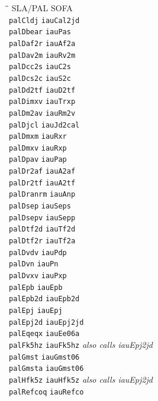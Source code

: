 \documentclass[twoside,11pt]{article}
\renewcommand{\_}{\texttt{\symbol{95}}}
\begin{document}
\begin{tabbing}
\hspace*{2cm}\=\hspace*{3cm}\= \kill
SLA/PAL \>  SOFA \\
\texttt{palCldj} \> \texttt{iauCal2jd} \\
\texttt{palDbear} \> \texttt{iauPas} \\
\texttt{palDaf2r} \> \texttt{iauAf2a} \\
\texttt{palDav2m} \>  \texttt{iauRv2m} \\
\texttt{palDcc2s} \>  \texttt{iauC2s} \\
\texttt{palDcs2c} \> \texttt{iauS2c} \\
\texttt{palDd2tf} \> \texttt{iauD2tf}\\
\texttt{palDimxv} \> \texttt{iauTrxp}\\
\texttt{palDm2av} \> \texttt{iauRm2v}\\
\texttt{palDjcl} \> \texttt{iauJd2cal}\\
\texttt{palDmxm} \> \texttt{iauRxr}\\
\texttt{palDmxv} \> \texttt{iauRxp}\\
\texttt{palDpav} \> \texttt{iauPap}\\
\texttt{palDr2af} \> \texttt{iauA2af}\\
\texttt{palDr2tf} \> \texttt{iauA2tf}\\
\texttt{palDranrm} \> \texttt{iauAnp}\\
\texttt{palDsep} \> \texttt{iauSeps}\\
\texttt{palDsepv} \> \texttt{iauSepp}\\
\texttt{palDtf2d} \> \texttt{iauTf2d}\\
\texttt{palDtf2r} \> \texttt{iauTf2a}\\
\texttt{palDvdv} \> \texttt{iauPdp}\\
\texttt{palDvn} \> \texttt{iauPn}\\
\texttt{palDvxv} \> \texttt{iauPxp}\\
\texttt{palEpb} \> \texttt{iauEpb}\\
\texttt{palEpb2d} \> \texttt{iauEpb2d}\\
\texttt{palEpj} \> \texttt{iauEpj}\\
\texttt{palEpj2d} \> \texttt{iauEpj2jd}\\
\texttt{palEqeqx} \> \texttt{iauEe06a}\\
\texttt{palFk5hz} \> \texttt{iauFk5hz} \textit{also calls iauEpj2jd}\\
\texttt{palGmst} \> \texttt{iauGmst06}\\
\texttt{palGmsta} \> \texttt{iauGmst06}\\
\texttt{palHfk5z} \> \texttt{iauHfk5z} \textit{also calls iauEpj2jd}\\
\texttt{palRefcoq} \> \texttt{iauRefco}\\
\end{tabbing}
\end{document}
